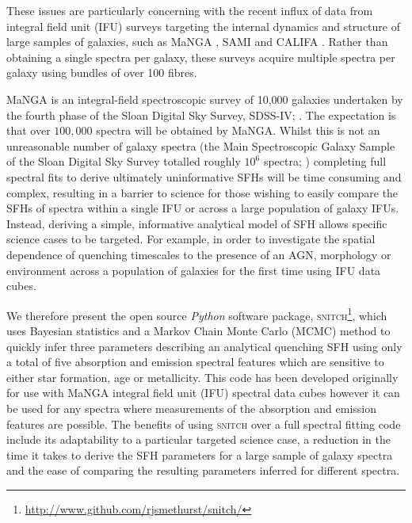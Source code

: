 \documentclass[useAMS,usenatbib]{mn2e}
\begin{document}
These issues are particularly concerning with the recent influx of data from integral field unit (IFU) surveys targeting the internal dynamics and structure of large samples of galaxies, such as MaNGA \protect\citep[Mapping Nearby Galaxies at Apache Point Observatory;][]{bundy15}, SAMI \protect\citep[Sydney-AAO Multi-object Integral-field spectrograph;][]{bryant12} and CALIFA \protect\citep[Calar Alto Legacy Integral Field spectroscopy Area survey;][]{sanchez12}. Rather than obtaining a single spectra per galaxy, these surveys acquire multiple spectra per galaxy using bundles of over 100 fibres. 

MaNGA \citep{bundy15} is an integral-field spectroscopic survey of 10,000 galaxies undertaken by the fourth phase of the Sloan Digital Sky Survey, SDSS-IV; \cite{blanton17}. The expectation is that over $100,000$ spectra will be obtained by MaNGA. Whilst this is not an unreasonable number of galaxy spectra (the Main Spectroscopic Galaxy Sample of the Sloan Digital Sky Survey totalled roughly $10^6$ spectra; \citealt{strauss02}) completing full spectral fits to derive ultimately uninformative SFHs will be time consuming and complex, resulting in a barrier to science for those wishing to easily compare the SFHs of spectra within a single IFU or across a large population of galaxy IFUs. Instead, deriving a simple, informative analytical model of SFH allows specific science cases to be targeted. For example, in order to investigate the spatial dependence of quenching timescales to the presence of an AGN, morphology or environment across a population of galaxies for the first time using IFU data cubes. 

We therefore present the open source \emph{Python} software package, \textsc{snitch}\footnote{\url{http://www.github.com/rjsmethurst/snitch/}}, which uses Bayesian statistics and a Markov Chain Monte Carlo (MCMC) method to quickly infer three parameters describing an analytical quenching SFH using only a total of five absorption and emission spectral features which are sensitive to either star formation, age or metallicity. This code has been developed originally for use with MaNGA integral field unit (IFU) spectral data cubes however it can be used for any spectra where measurements of the absorption and emission features are possible. The benefits of using \textsc{snitch} over a full spectral fitting code include its adaptability to a particular targeted science case, a reduction in the time it takes to derive the SFH parameters for a large sample of galaxy spectra and the ease of comparing the resulting parameters inferred for different spectra. 
\end{document}
